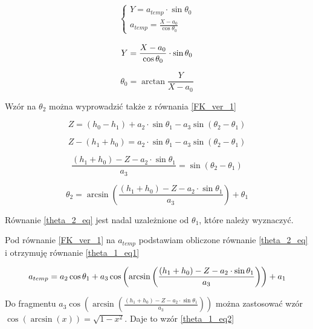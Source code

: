 \documentclass[a4paper,13pt]{article}
\begin{document}
\begin{equation}
\begin{split}
\begin{cases}
Y = a_{temp} \cdot \sin{\theta_0}\\
a_{temp} = \frac{X - a_0}{\cos{\theta_0}}
\end{cases}
\end{split}
\end{equation}


\begin{equation}
Y = \frac{X - a_0}{\cos{\theta_0}} \cdot \sin{\theta_0}\\
\end{equation}

\begin{equation}
\theta_0 = \arctan{\frac{Y}{X - a_0}}
\end{equation}

Wzór na $\theta_2$ można wyprowadzić także z równania \ref{FK_ver_1}

\[
Z = (h_0 - h_1) + a_2 \cdot \sin{\theta_1} - a_3 \sin{\left( \theta_2 - \theta_1 \right)}
\]

\[
Z - (h_1 + h_0) = a_2 \cdot \sin{\theta_1} - a_3 \sin{\left( \theta_2 - \theta_1 \right)}
\]

\[
\frac{(h_1 + h_0) - Z - a_2 \cdot \sin{\theta_1}}{a_3} = \sin{\left( \theta_2 - \theta_1 \right)}
\]


\begin{equation} \label{theta_2_eq}
\theta_2 = \arcsin{\left(\frac{(h_1 + h_0) - Z - a_2 \cdot \sin{\theta_1}}{a_3}\right)} + \theta_1
\end{equation}

Równanie \ref{theta_2_eq} jest nadal uzależnione od $\theta_1$, które należy wyznaczyć.

Pod równanie \ref{FK_ver_1} na $a_{temp}$ podstawiam obliczone równanie \ref{theta_2_eq} i otrzymuję równanie  \ref{theta_1_eq1}

\begin{equation} \label{theta_1_eq1}
a_{temp} = a_2 \cos{\theta_1} + a_3 \cos{\left(\arcsin{\left(\frac{(h_1 + h_0) - Z - a_2 \cdot \sin{\theta_1}}{a_3}\right)}\right)} + a_1\\
\end{equation}

Do fragmentu $a_3 \cos{\left(\arcsin{\left(\frac{(h_1 + h_0) - Z - a_2 \cdot \sin{\theta_1}}{a_3}\right)}\right)}$ można zastosować wzór $\cos{\left(\arcsin{\left(x\right)}\right)} = \sqrt{1 - x^2}$. Daje to wzór \ref{theta_1_eq2}
\end{document}
